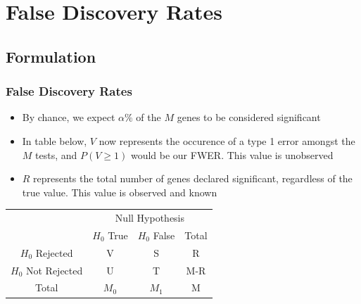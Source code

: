 \documentclass[11pt]{beamer}
\begin{document}
\section{False Discovery Rates}
\subsection{Formulation}
\begin{frame}
\frametitle{False Discovery Rates}
{
\begin{itemize}
\item By chance, we expect $\alpha \%$ of the $M$ genes to be considered significant \\
\item In table below, $V$ now represents the occurence of a type 1 error amongst the $M$ tests, and $P(V \geq 1)$ would be our FWER. This value is unobserved
\item $R$ represents the total number of genes declared significant, regardless of the true value. This value is observed and known
\end{itemize}

\begin{center}
\begin{tabular}{c| c c c}
\hline
& \multicolumn{3}{c}{Null Hypothesis} \\[3pt]
& $H_0$ True & $H_0$ False & Total\\
\hline 
$H_0$ Rejected & V & S & R \\[2pt]
$H_0$ Not Rejected & U & T  & M-R \\[1pt]
\hline
Total & $M_0$& $M_1$& M\\
\hline
\end{tabular}
\end{center}
}
\end{frame}
\end{document}
